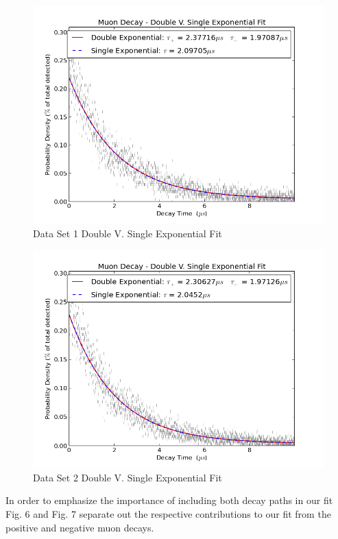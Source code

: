 \begin{figure}[H]
\begin{center}
\includegraphics[width=4 in]{graph_EPBB1_DbleExp.png}
\caption{Data Set 1 Double V. Single Exponential Fit}
\end{center}
\end{figure}

\begin{figure}[H]
\begin{center}
\includegraphics[width=4 in]{graph_EPBB2_DbleExp.png}
\caption{Data Set 2 Double V. Single Exponential Fit}
\end{center}
\end{figure} 

\indent \indent In order to emphasize the importance of including both decay paths in our fit Fig. 6 and Fig. 7 separate out the respective contributions to our fit from the positive and negative muon decays. 

